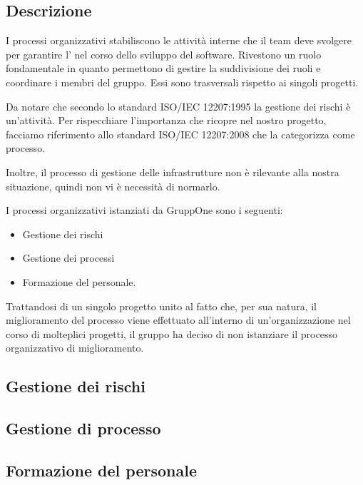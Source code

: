 \documentclass[../norme-di-progetto.tex]{subfiles}
\begin{document}
\subsection{Descrizione}%
\label{sub:processi_organizzativi/descrizione}

I processi organizzativi stabiliscono le attività interne che il team deve svolgere per garantire l' nel corso dello sviluppo del software.
Rivestono un ruolo fondamentale in quanto permettono di gestire la suddivisione dei ruoli e coordinare i membri del gruppo.
Essi sono trasversali rispetto ai singoli progetti.

Da notare che secondo lo standard ISO/IEC 12207:1995 la gestione dei rischi è un'attività.
Per rispecchiare l'importanza che ricopre nel nostro progetto, facciamo riferimento allo standard ISO/IEC 12207:2008 che la categorizza come processo.

Inoltre, il processo di gestione delle infrastrutture non è rilevante alla nostra situazione, quindi non vi è necessità di normarlo.

I processi organizzativi istanziati da GruppOne sono i seguenti:

\begin{itemize}
  \item Gestione dei rischi
  \item Gestione dei processi
  \item Formazione del personale.
\end{itemize}

Trattandosi di un singolo progetto unito al fatto che, per sua natura, il miglioramento del processo viene effettuato all'interno di un'organizzazione nel corso di molteplici progetti, il gruppo ha deciso di non istanziare il processo organizzativo di miglioramento.


\subsection{Gestione dei rischi}%
\label{sub:gestione_dei_rischi}



\subsection{Gestione di processo}%
\label{sub:gestione_di_processo}



\subsection{Formazione del personale}%
\label{sub:formazione_del_personale}


\end{document}
